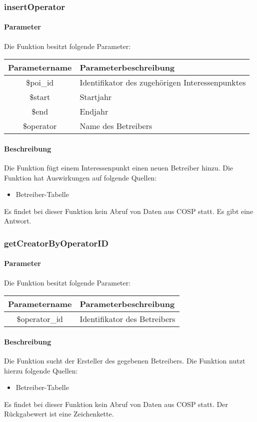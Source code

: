\subsubsection{insertOperator}
\paragraph{Parameter} Die Funktion besitzt folgende Parameter:
\begin{table}[H]
	\begin{tabular}{|c|p{11cm}|}
		\hline
		\textbf{Parametername} & \textbf{Parameterbeschreibung} \\ \hline
		\$poi\_id  & Identifikator des zugehörigen Interessenpunktes \\ \hline
		\$start    & Startjahr \\ \hline
		\$end      & Endjahr \\ \hline
		\$operator & Name des Betreibers \\ \hline
	\end{tabular}
\end{table}
\paragraph{Beschreibung} Die Funktion fügt einem Interessenpunkt einen neuen Betreiber hinzu. Die Funktion hat Auswirkungen auf folgende Quellen:
\begin{itemize}
	\item Betreiber-Tabelle
\end{itemize}
Es findet bei dieser Funktion kein Abruf von Daten aus {\glqq COSP\grqq} statt. Es gibt eine Antwort.
\subsubsection{getCreatorByOperatorID}
\paragraph{Parameter} Die Funktion besitzt folgende Parameter:
\begin{table}[H]
	\begin{tabular}{|c|p{11cm}|}
		\hline
		\textbf{Parametername} & \textbf{Parameterbeschreibung} \\ \hline
		\$operator\_id & Identifikator des Betreibers \\ \hline
	\end{tabular}
\end{table}
\paragraph{Beschreibung} Die Funktion sucht der Ersteller des gegebenen Betreibers. Die Funktion nutzt hierzu folgende Quellen:
\begin{itemize}
	\item Betreiber-Tabelle
\end{itemize}
Es findet bei dieser Funktion kein Abruf von Daten aus {\glqq COSP\grqq} statt. Der Rückgabewert ist eine Zeichenkette.
